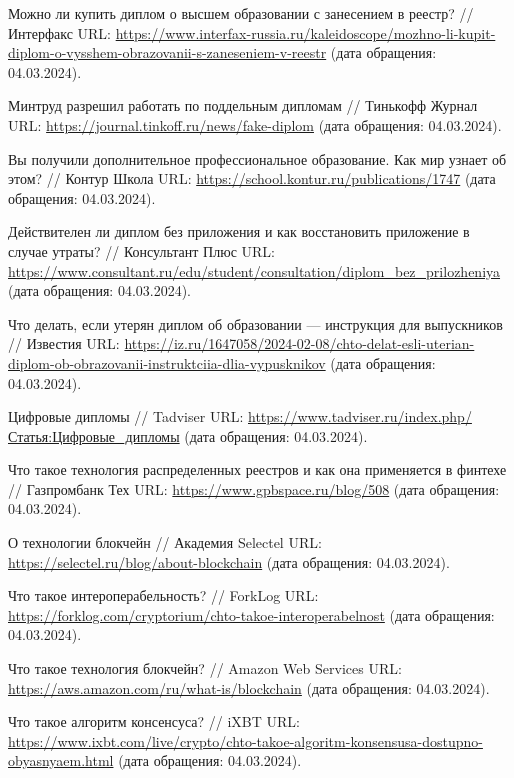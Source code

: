 \begin{thebibliography}{99\kern\bibindent}
	 Можно ли купить диплом о высшем образовании с занесением в реестр? // Интерфакс URL: \url{https://www.interfax-russia.ru/kaleidoscope/mozhno-li-kupit-diplom-o-vysshem-obrazovanii-s-zaneseniem-v-reestr} (дата обращения: 04.03.2024).

	 Минтруд разрешил работать по поддельным дипломам // Тинькофф Журнал URL: \url{https://journal.tinkoff.ru/news/fake-diplom} (дата обращения: 04.03.2024).

	 Вы получили дополнительное профессиональное образование. Как мир узнает об этом? // Контур Школа URL: \url{https://school.kontur.ru/publications/1747} (дата обращения: 04.03.2024).

	 Действителен ли диплом без приложения и как восстановить приложение в случае утраты? // Консультант Плюс URL: \url{https://www.consultant.ru/edu/student/consultation/diplom_bez_prilozheniya} (дата обращения: 04.03.2024).

	 Что делать, если утерян диплом об образовании — инструкция для выпускников // Известия URL: \url{https://iz.ru/1647058/2024-02-08/chto-delat-esli-uterian-diplom-ob-obrazovanii-instruktciia-dlia-vypusknikov} (дата обращения: 04.03.2024).

	 Цифровые дипломы // Tadviser URL: \url{https://www.tadviser.ru/index.php/Статья:Цифровые_дипломы} (дата обращения: 04.03.2024).

	 Что такое технология распределенных реестров и как она применяется в финтехе // Газпромбанк Тех URL: \url{https://www.gpbspace.ru/blog/508} (дата обращения: 04.03.2024).

	 О технологии блокчейн // Академия Selectel URL: \url{https://selectel.ru/blog/about-blockchain} (дата обращения: 04.03.2024).

	 Что такое интероперабельность? // ForkLog URL: \url{https://forklog.com/cryptorium/chto-takoe-interoperabelnost} (дата обращения: 04.03.2024).

	 Что такое технология блокчейн? // Amazon Web Services URL: \url{https://aws.amazon.com/ru/what-is/blockchain} (дата обращения: 04.03.2024).

	 Что такое алгоритм консенсуса? // iXBT URL: \url{https://www.ixbt.com/live/crypto/chto-takoe-algoritm-konsensusa-dostupno-obyasnyaem.html} (дата обращения: 04.03.2024).


\end{thebibliography}
